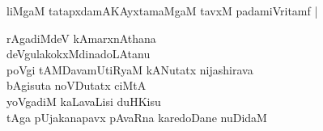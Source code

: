 \begin{entry}
\smallskip
\begin{shl}
liMgaM tatapxdamAKAyxtamaMgaM tavxM padamiVritamf |
\end{shl}
\medskip
{}
\end{entry}

\begin{entry}

\smallskip
\begin{shl}
rAgadiMdeV kAmarxnAthana\\
deVgulakokxMdinadoLAtanu\\
poVgi tAMDavamUtiRyaM kANutatx nijashirava\\
bAgisuta noVDutatx ciMtA\\
yoVgadiM kaLavaLisi duHKisu\\
tAga pUjakanapavx pAvaRna karedoDane nuDidaM
\end{shl}
\medskip
{}
\end{entry}

